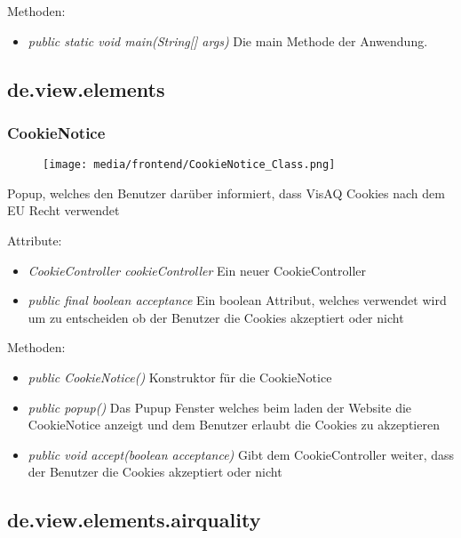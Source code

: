 Methoden:
\begin{itemize} 
    \item \emph{public static void main(String[] args)} Die main Methode der Anwendung.
\end{itemize} 

\subsection{de.view.elements}

\subsubsection{CookieNotice}
\begin{minipage}{0.3\textwidth}
    \begin{figure}[H]
        \texttt{[image: media/frontend/CookieNotice\_Class.png]}
    \end{figure}
    \end{minipage} \hfill
    \begin{minipage}{0.6\textwidth}
Popup, welches den Benutzer darüber informiert, dass VisAQ Cookies nach dem EU Recht verwendet
\end{minipage}

Attribute:
\begin{itemize} 
    \item \emph{CookieController cookieController} Ein neuer CookieController
    \item \emph{public final boolean acceptance} Ein boolean Attribut, welches verwendet wird um zu entscheiden ob der Benutzer die Cookies akzeptiert oder nicht
\end{itemize}
Methoden:
\begin{itemize} 
    \item \emph{public CookieNotice()} Konstruktor für die CookieNotice
    \item \emph{public popup()} Das Pupup Fenster welches beim laden der Website die CookieNotice anzeigt und dem Benutzer erlaubt die Cookies zu akzeptieren
    \item \emph{public void accept(boolean acceptance)} Gibt dem CookieController weiter, dass der Benutzer die Cookies akzeptiert oder nicht
\end{itemize}


\subsection{de.view.elements.airquality}

